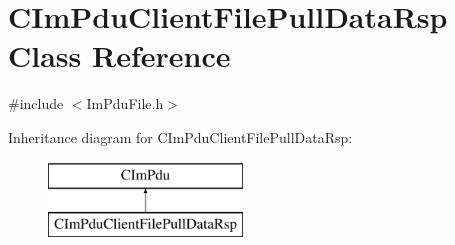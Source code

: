 \hypertarget{class_c_im_pdu_client_file_pull_data_rsp}{}\section{C\+Im\+Pdu\+Client\+File\+Pull\+Data\+Rsp Class Reference}
\label{class_c_im_pdu_client_file_pull_data_rsp}


{\ttfamily \#include $<$Im\+Pdu\+File.\+h$>$}

Inheritance diagram for C\+Im\+Pdu\+Client\+File\+Pull\+Data\+Rsp\+:\begin{figure}[H]
\begin{center}
\leavevmode
\includegraphics[height=2.000000cm]{class_c_im_pdu_client_file_pull_data_rsp}
\end{center}
\end{figure}
